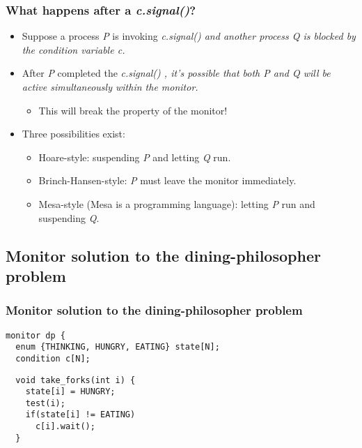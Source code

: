\documentclass[CJKutf8,dvipsnames,table]{beamer}
\begin{document}
\begin{CJK*}{UTF8}{song}
  \begin{frame}
  \frametitle{What happens after a \emph{c.signal()}?} \pause
  \begin{itemize}
  \item Suppose a process \emph{P} is invoking \emph{c.signal()  and another
    process \emph{Q} is blocked by the condition variable \emph{c}.} \pause
  \item After \emph{P} completed the \emph{c.signal() , it's possible that
    both \emph{P} and \emph{Q} will be active simultaneously within the monitor.} \pause
    \begin{itemize}
    \item This will break the property of the monitor!  \pause
    \end{itemize}
  \item Three possibilities exist:  \pause
    \begin{itemize}
    \item Hoare-style: suspending \emph{P} and letting \emph{Q} run.  \pause
    \item Brinch-Hansen-style: \emph{P} must leave the monitor immediately.  \pause
    \item Mesa-style (Mesa is a programming language): letting \emph{P} run and suspending \emph{Q}. 
    \end{itemize}
  \end{itemize}
  \end{frame}

  \subsection{Monitor solution to the dining-philosopher problem}

  \begin{frame}[fragile]
  \frametitle{Monitor solution to the dining-philosopher problem} \pause

\begin{lstlisting}
monitor dp {
  enum {THINKING, HUNGRY, EATING} state[N];
  condition c[N];
\end{lstlisting}

  \begin{minipage}[c]{0.5\textwidth}
\begin{lstlisting}
  void take_forks(int i) {
    state[i] = HUNGRY;
    test(i);
    if(state[i] != EATING)
      c[i].wait();
  }
\end{lstlisting}

  \end{minipage}%
  \begin{minipage}[c]{0.5\textwidth}


\end{minipage}
\end{frame}
\end{CJK*}
\end{document}
